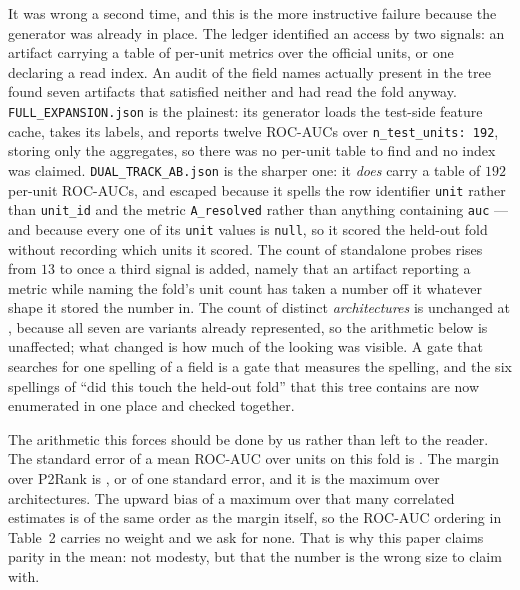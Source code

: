 \documentclass[11pt]{article}
\begin{document}
It was wrong a second time, and this is the more instructive failure because the
generator was already in place. The ledger identified an access by two signals:
an artifact carrying a table of per-unit metrics over the official units, or one
declaring a read index. An audit of the field names actually present in the tree
found seven artifacts that satisfied neither and had read the fold anyway.
\texttt{FULL\_EXPANSION.json} is the plainest: its generator loads the test-side
feature cache, takes its labels, and reports twelve ROC-AUCs over
\texttt{n\_test\_units: 192}, storing only the aggregates, so there was no
per-unit table to find and no index was claimed. \texttt{DUAL\_TRACK\_AB.json}
is the sharper one: it \emph{does} carry a table of $192$ per-unit ROC-AUCs, and
escaped because it spells the row identifier \texttt{unit} rather than
\texttt{unit\_id} and the metric \texttt{A\_resolved} rather than anything
containing \texttt{auc} --- and because every one of its \texttt{unit} values is
\texttt{null}, so it scored the held-out fold without recording which units it
scored. The count of standalone probes rises from $13$ to
\NStandaloneProbes{} once a third signal is added, namely that an artifact
reporting a metric while naming the fold's unit count has taken a number off it
whatever shape it stored the number in. The count of distinct \emph{architectures}
is unchanged at \NArchOnFold{}, because all seven are variants already
represented, so the arithmetic below is unaffected; what changed is how much of
the looking was visible. A gate that searches for one spelling of a field is a
gate that measures the spelling, and the six spellings of ``did this touch the
held-out fold'' that this tree contains are now enumerated in one place and
checked together.

The arithmetic this forces should be done by us rather than left to the reader.
The standard error of a mean ROC-AUC over \NUnits{} units on this fold is
\FoldSE{}. The margin over P2Rank is \TabAucD{}, or \LeadInSE{} of one standard
error, and it is the maximum over \NArchOnFold{} architectures. The upward bias
of a maximum over that many correlated estimates is of the same order as the
margin itself, so the ROC-AUC ordering in Table~2 carries no weight and we ask
for none. That is why this paper claims parity in the mean: not modesty, but that
the number is the wrong size to claim with.
\end{document}
